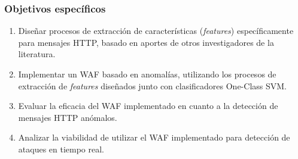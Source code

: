 \begin{frame}
    \frametitle{Objetivos específicos}

    \begin{enumerate}[<+(1)->]
        \item
        Diseñar procesos de extracción de características (\textit{features})
        específicamente para mensajes HTTP, basado en aportes de otros
        investigadores de la literatura.

        \item
        Implementar un WAF basado en anomalías, utilizando los procesos de
        extracción de \textit{features} diseñados junto con clasificadores
        One-Class SVM.

        \item
        Evaluar la eficacia del WAF implementado en cuanto a la detección
        de mensajes HTTP anómalos.

        \item
        Analizar la viabilidad de utilizar el WAF implementado para
        detección de ataques en tiempo real.
    \end{enumerate}
\end{frame}
